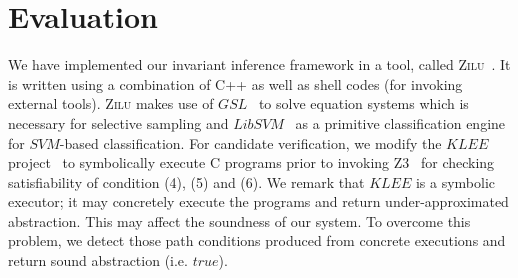 
\section{Evaluation} %
\label{sec:evaluations}
We have implemented our invariant inference framework in a tool, called \textsc{Zilu}~\cite{zilu:repo}.
It is written using a combination of C++ as well as shell codes (for invoking external tools).
\textsc{Zilu} makes use of $\mathit{GSL}$~\cite{gough2009gnu} to solve equation systems which is necessary for selective sampling and
 $\mathit{LibSVM}$~\cite{chang2011libsvm} as a primitive classification engine for
$\mathit{SVM}$-based classification. %
For candidate verification, we %
modify the $\mathit{KLEE}$ project~\cite{cadar2008klee} to
symbolically execute
 C programs %
prior to invoking Z3~\cite{de2008z3} for checking satisfiability of
condition (4), (5) and (6).
 We remark that $\mathit{KLEE}$ is a symbolic executor; it may
concretely execute the programs and return
 under-approximated
abstraction. This may affect the soundness of our system.
To overcome this problem, we detect those path conditions produced from
concrete executions
and return sound abstraction (i.e. $true$). %


